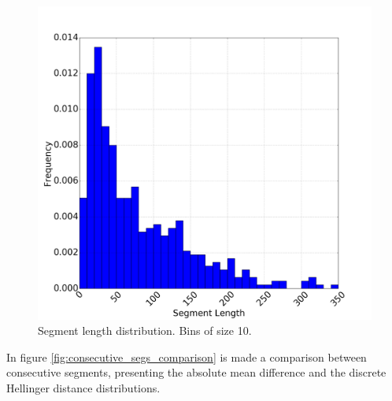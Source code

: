 \begin{figure}[H]
    \centering
    \includegraphics[width=0.6\linewidth]{./figures/dataset/cp/middle_segment_length.png}
    \caption{Segment length distribution. Bins of size 10.}
    \label{fig:segs_length}
\end{figure}%

In figure \ref{fig:consecutive_segs_comparison} is made a comparison between consecutive segments, presenting the absolute mean difference and the discrete Hellinger distance distributions.

